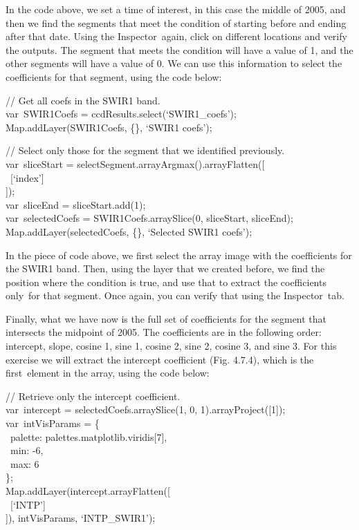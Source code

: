 \documentclass[
  letterpaper,
  DIV=11,
  numbers=noendperiod]{scrreprt}
\begin{document}
In the code above, we set a time of interest, in this case the middle of
2005, and then we find the segments that meet the condition of starting
before and ending after that date. Using the Inspector~again, click on
different locations and verify the outputs. The segment that meets the
condition will have a value of 1, and the other segments will have a
value of 0. We can use this information to select the coefficients for
that segment, using the code below:

// Get all coefs in the SWIR1 band.\\
var~SWIR1Coefs = ccdResults.select(`SWIR1\_coefs');\\
Map.addLayer(SWIR1Coefs, \{\}, `SWIR1 coefs');

// Select only those for the segment that we identified previously.\\
var~sliceStart = selectSegment.arrayArgmax().arrayFlatten({[}\\
\hspace*{0.333em} ~{[}`index'{]}\\
{]});\\
var~sliceEnd = sliceStart.add(1);\\
var~selectedCoefs = SWIR1Coefs.arraySlice(0, sliceStart, sliceEnd);\\
Map.addLayer(selectedCoefs, \{\}, `Selected SWIR1 coefs');

In the piece of code above, we first select the array image with the
coefficients for the SWIR1 band. Then, using the layer that we created
before, we find the position where the condition is true, and use that
to extract the coefficients only~for that segment. Once again, you can
verify that using the Inspector~tab.

Finally, what we have now is the full set of coefficients for the
segment that intersects the midpoint of 2005. The coefficients are in
the following order: intercept, slope, cosine 1, sine 1, cosine 2, sine
2, cosine 3, and sine 3. For this exercise we will extract the intercept
coefficient (Fig. 4.7.4), which is the first~element in the array, using
the code below:

// Retrieve only the intercept coefficient.\\
var~intercept = selectedCoefs.arraySlice(1, 0,
1).arrayProject({[}1{]});\\
var~intVisParams = \{\\
\hspace*{0.333em} ~palette: palettes.matplotlib.viridis{[}7{]},\\
\hspace*{0.333em} ~min: -6,\\
\hspace*{0.333em} ~max: 6\\
\};\\
Map.addLayer(intercept.arrayFlatten({[}\\
\hspace*{0.333em} ~{[}`INTP'{]}\\
{]}), intVisParams, `INTP\_SWIR1');
\end{document}
